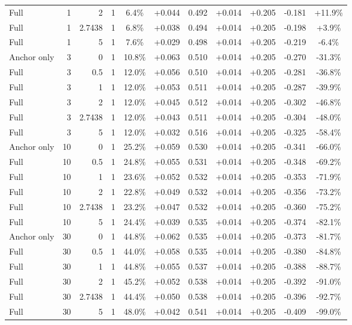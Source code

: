 \begin{table}[htbp]
\begin{tabular}{lrrrccccccc}
Full & 1 & 2 & 1 & 6.4\% & +0.044 & 0.492 & +0.014 & +0.205 & -0.181 & +11.9\% \\
Full & 1 & 2.7438 & 1 & 6.8\% & +0.038 & 0.494 & +0.014 & +0.205 & -0.198 & +3.9\% \\
Full & 1 & 5 & 1 & 7.6\% & +0.029 & 0.498 & +0.014 & +0.205 & -0.219 & -6.4\% \\
Anchor only & 3 & 0 & 1 & 10.8\% & +0.063 & 0.510 & +0.014 & +0.205 & -0.270 & -31.3\% \\
Full & 3 & 0.5 & 1 & 12.0\% & +0.056 & 0.510 & +0.014 & +0.205 & -0.281 & -36.8\% \\
Full & 3 & 1 & 1 & 12.0\% & +0.053 & 0.511 & +0.014 & +0.205 & -0.287 & -39.9\% \\
Full & 3 & 2 & 1 & 12.0\% & +0.045 & 0.512 & +0.014 & +0.205 & -0.302 & -46.8\% \\
Full & 3 & 2.7438 & 1 & 12.0\% & +0.043 & 0.511 & +0.014 & +0.205 & -0.304 & -48.0\% \\
Full & 3 & 5 & 1 & 12.0\% & +0.032 & 0.516 & +0.014 & +0.205 & -0.325 & -58.4\% \\
Anchor only & 10 & 0 & 1 & 25.2\% & +0.059 & 0.530 & +0.014 & +0.205 & -0.341 & -66.0\% \\
Full & 10 & 0.5 & 1 & 24.8\% & +0.055 & 0.531 & +0.014 & +0.205 & -0.348 & -69.2\% \\
Full & 10 & 1 & 1 & 23.6\% & +0.052 & 0.532 & +0.014 & +0.205 & -0.353 & -71.9\% \\
Full & 10 & 2 & 1 & 22.8\% & +0.049 & 0.532 & +0.014 & +0.205 & -0.356 & -73.2\% \\
Full & 10 & 2.7438 & 1 & 23.2\% & +0.047 & 0.532 & +0.014 & +0.205 & -0.360 & -75.2\% \\
Full & 10 & 5 & 1 & 24.4\% & +0.039 & 0.535 & +0.014 & +0.205 & -0.374 & -82.1\% \\
Anchor only & 30 & 0 & 1 & 44.8\% & +0.062 & 0.535 & +0.014 & +0.205 & -0.373 & -81.7\% \\
Full & 30 & 0.5 & 1 & 44.0\% & +0.058 & 0.535 & +0.014 & +0.205 & -0.380 & -84.8\% \\
Full & 30 & 1 & 1 & 44.8\% & +0.055 & 0.537 & +0.014 & +0.205 & -0.388 & -88.7\% \\
Full & 30 & 2 & 1 & 45.2\% & +0.052 & 0.538 & +0.014 & +0.205 & -0.392 & -91.0\% \\
Full & 30 & 2.7438 & 1 & 44.4\% & +0.050 & 0.538 & +0.014 & +0.205 & -0.396 & -92.7\% \\
Full & 30 & 5 & 1 & 48.0\% & +0.042 & 0.541 & +0.014 & +0.205 & -0.409 & -99.0\% \\

\end{tabular}
\end{table}
